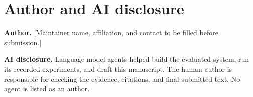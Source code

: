 \section*{Author and AI disclosure}

\textbf{Author.} [Maintainer name, affiliation, and contact to be filled before submission.]

\textbf{AI disclosure.} Language-model agents helped build the evaluated system, run its recorded experiments, and draft this manuscript. The human author is responsible for checking the evidence, citations, and final submitted text. No agent is listed as an author.
